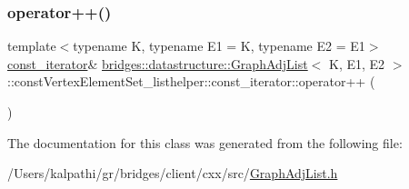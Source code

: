 \subsubsection{\texorpdfstring{operator++()}{operator++()}}
{\footnotesize\ttfamily template$<$typename K, typename E1 = K, typename E2 = E1$>$ \\
\mbox{\hyperlink{classbridges_1_1datastructure_1_1_graph_adj_list_1_1const_vertex_element_set__listhelper_1_1const__iterator}{const\+\_\+iterator}}\& \mbox{\hyperlink{classbridges_1_1datastructure_1_1_graph_adj_list}{bridges\+::datastructure\+::\+Graph\+Adj\+List}}$<$ K, E1, E2 $>$\+::const\+Vertex\+Element\+Set\+\_\+listhelper\+::const\+\_\+iterator\+::operator++ (\begin{DoxyParamCaption}{ }\end{DoxyParamCaption})\hspace{0.3cm}{\ttfamily [inline]}}



The documentation for this class was generated from the following file\+:\begin{DoxyCompactItemize}
\item 
/\+Users/kalpathi/gr/bridges/client/cxx/src/\mbox{\hyperlink{_graph_adj_list_8h}{Graph\+Adj\+List.\+h}}\end{DoxyCompactItemize}
